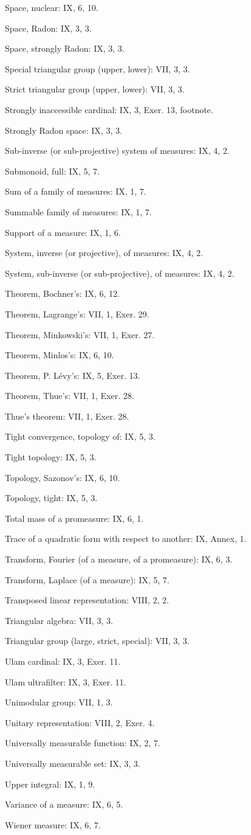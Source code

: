Space, nuclear: IX, 6, 10.

Space, Radon: IX, 3, 3.

Space, strongly Radon: IX, 3, 3.

Special triangular group (upper, lower): VII, 3, 3.

Strict triangular group (upper, lower): VII, 3, 3.

Strongly inaccessible cardinal: IX, 3, Exer. 13, footnote.

Strongly Radon space: IX, 3, 3.

Sub-inverse (or sub-projective) system of measures: IX, 4, 2.

Submonoid, full: IX, 5, 7.

Sum of a family of measures: IX, 1, 7.

Summable family of measures: IX, 1, 7.

Support of a measure: IX, 1, 6.

System, inverse (or projective), of measures: IX, 4, 2.

System, sub-inverse (or sub-projective), of measures: IX, 4, 2.

Theorem, Bochner's: IX, 6, 12.

Theorem, Lagrange's: VII, 1, Exer. 29.

Theorem, Minkowski's: VII, 1, Exer. 27.

Theorem, Minlos's: IX, 6, 10.

Theorem, P. Lévy's: IX, 5, Exer. 13.

Theorem, Thue's: VII, 1, Exer. 28.

Thue's theorem: VII, 1, Exer. 28.

Tight convergence, topology of: IX, 5, 3.

Tight topology: IX, 5, 3.

Topology, Sazonov's: IX, 6, 10.

Topology, tight: IX, 5, 3.

Total mass of a promeasure: IX, 6, 1.

Trace of a quadratic form with respect to another: IX, Annex, 1.

Transform, Fourier (of a measure, of a promeasure): IX, 6, 3.

Transform, Laplace (of a measure): IX, 5, 7.

Transposed linear representation: VIII, 2, 2.

Triangular algebra: VII, 3, 3.

Triangular group (large, strict, special): VII, 3, 3.

Ulam cardinal: IX, 3, Exer. 11.

Ulam ultrafilter: IX, 3, Exer. 11.

Unimodular group: VII, 1, 3.

Unitary representation: VIII, 2, Exer. 4.

Universally measurable function: IX, 2, 7.

Universally measurable set: IX, 3, 3.

Upper integral: IX, 1, 9.

Variance of a measure: IX, 6, 5.

Wiener measure: IX, 6, 7.

